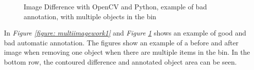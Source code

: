 \begin{figure}[ht]
 \centering
 \hspace{0.5cm}
 \hspace{0.5cm}
 \hspace{0.5cm}
 \caption{Image Difference with OpenCV and Python, example of bad annotation, with multiple objects in the bin}
 \label{figure: multiimagework2}
\end{figure}

In \textit{Figure \ref{figure: multiimagework1}} and \textit{Figure \ref{figure: multiimagework2}} shows an example of good and bad automatic annotation. The figures show an example of a before and after image when removing one object when there are multiple items in the bin. In the bottom row, the contoured difference and annotated object area can be seen. %

